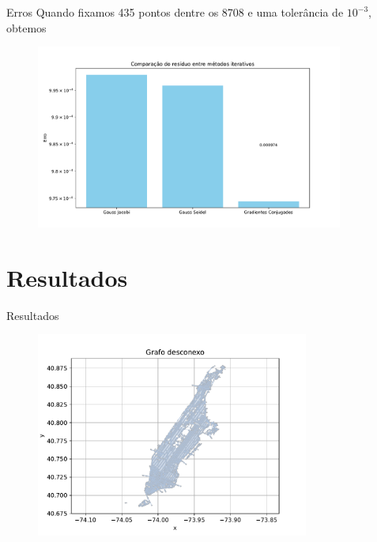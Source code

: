 \documentclass[11pt]{beamer}
\begin{document}
\begin{frame}{Erros}
    Quando fixamos 435 pontos dentre os 8708 e uma tolerância de $10^{-3}$, obtemos
    \begin{figure}[htb]
        \label{fig:erros_iterativos_435pontos}
        \centering
        \includegraphics[width=0.9\textwidth]{../figs/fig15.pdf}
    \end{figure}
\end{frame}

\section{Resultados}

\begin{frame}{Resultados}
    \begin{figure}[htb]
        \label{fig:grafo_desconexo}
        \centering
        \includegraphics[width=0.8\textwidth]{../figs/fig1.pdf}
    \end{figure}
\end{frame}
\end{document}
